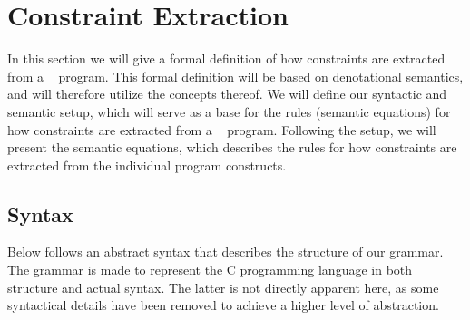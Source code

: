 
\section{Constraint Extraction}
In this section we will give a formal definition of how constraints are extracted from a \thelang~ program.
This formal definition will be based on denotational semantics, and will therefore utilize the concepts thereof.
We will define our syntactic and semantic setup, which will serve as a base for the rules (semantic equations) for how constraints are extracted from a \thelang~ program.
Following the setup, we will present the semantic equations, which describes the rules for how constraints are extracted from the individual program constructs.

\subsection{Syntax}
Below follows an abstract syntax that describes the structure of our grammar.
The grammar is made to represent the C programming language in both structure and actual syntax.
The latter is not directly apparent here, as some syntactical details have been removed to achieve a higher level of abstraction.

